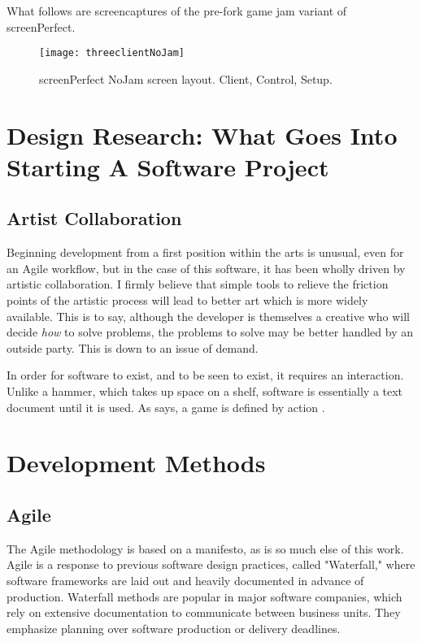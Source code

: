What follows are screencaptures of the pre-fork game jam variant of screenPerfect.

\begin{figure}[h]
  \caption{screenPerfect NoJam screen layout. Client, Control, Setup.}
  \centering
    \texttt{[image: threeclientNoJam]}
\end{figure}

\section{Design Research: What Goes Into Starting A Software Project}

\subsection{Artist Collaboration}

Beginning development from a first position within the arts is unusual, even for an Agile workflow, but in the case of this software, it has been wholly driven by artistic collaboration. I firmly believe that simple tools to relieve the friction points of the artistic process will lead to better art which is more widely available. This is to say, although the developer is themselves a creative who will decide \textit{how} to solve problems, the problems to solve may be better handled by an outside party. This is down to an issue of demand. 

In order for software to exist, and to be seen to exist, it requires an interaction. Unlike a hammer, which takes up space on a shelf, software is essentially a text document until it is used. As \citeauthor{galloway}says, a game is defined by action \citeyear{galloway}. \cite{galloway}


\section{Development Methods}
\subsection{Agile}
The Agile methodology is based on a manifesto, as is so much else of this work. Agile is a response to previous software design practices, called "Waterfall," where software frameworks are laid out and heavily documented in advance of production. Waterfall methods are popular in major software companies, which rely on extensive documentation to communicate between business units. They emphasize planning over software production or delivery deadlines. 

